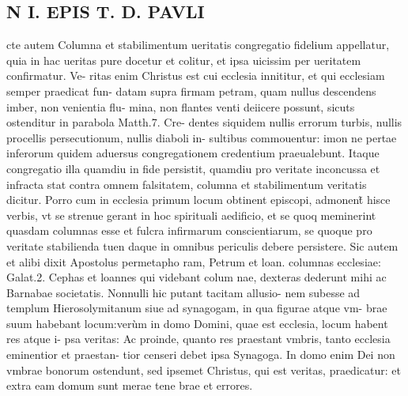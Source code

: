 \documentclass{article}
\begin{document}
\begin{pages}
\section*{N I. EPIS T. D. PAVLI }
\marginpar{[ p.88 ]}\pstart cte autem Columna et stabilimentum ueritatis congregatio fidelium appellatur, quia in hac ueritas pure docetur et colitur, et ipsa uicissim per ueritatem confirmatur. Ve- ritas enim Christus est cui ecclesia innititur, et qui ecclesiam semper praedicat fun- datam supra firmam petram, quam nullus descendens imber, non venientia flu- mina, non flantes venti deiicere possunt, sicuts ostenditur in parabola Matth.7. Cre- dentes siquidem nullis errorum turbis, nullis procellis persecutionum, nullis diaboli in- sultibus commouentur: imon ne pertae inferorum quidem aduersus congregationem credentium praeualebunt. Itaque congregatio illa quamdiu in fide persistit, quamdiu pro veritate inconcussa et infracta stat contra omnem falsitatem, columna et stabilimentum veritatis dicitur. Porro cum in ecclesia primum locum obtinent episcopi, admonent̃ hisce verbis, vt se strenue gerant in hoc spirituali aedificio, et se quoq meminerint quasdam columnas esse et fulcra infirmarum conscientiarum, se quoque pro veritate stabilienda tuen daque in omnibus periculis debere persistere. Sic autem et alibi dixit Apostolus permetapho ram, Petrum et loan. columnas ecclesiae: Galat.2. Cephas et loannes qui videbant colum nae, dexteras dederunt mihi ac Barnabae societatis. Nonnulli hic putant tacitam allusio- nem subesse ad templum Hierosolymitanum siue ad synagogam, in qua figurae atque vm- brae suum habebant locum:verùm in domo Domini, quae est ecclesia, locum habent res atque i- psa veritas: Ac proinde, quanto res praestant vmbris, tanto ecclesia eminentior et praestan- tior censeri debet ipsa Synagoga. In domo enim Dei non vmbrae bonorum ostendunt, sed ipsemet Christus, qui est veritas, praedicatur: et extra eam domum sunt merae tene brae et errores.  \pend
{}
{}

\end{pages}
\end{document}
